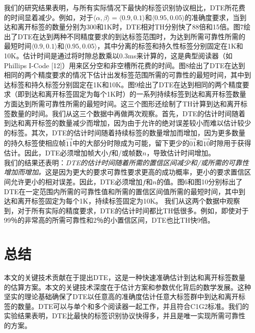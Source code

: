 \documentclass[UTF8]{ctexart}
\begin{document}
	我们的研究结果表明，与所有实际情况下最快的标签识别协议相比，DTE所花费的时间显着减少。例如，对于$\langle\alpha,\beta\rangle = \langle 0.9,0.1\rangle$和$\langle 0.95,0.05\rangle$的准确度要求，当到达和离开标签的数量分别为300和1K时，DTE相对TH分别快了88倍和15倍。图7绘出了DTE在达到两种不同精度要求的到达标签范围时，为达到所需可靠性所需的最短时间$\langle 0.9,0.1\rangle$和$\langle 0.95,0.05\rangle$，其中分离的标签和持久性标签分别固定在1K和10K。估计时间是通过将时隙总数乘以0.3ms来计算的，这是典型阅读器（如Phillips I-Code [12]）用来区分空和非空槽所花费的时间。图8绘出了DTE在达到相同的两个精度要求的情况下估计出发标签范围所需的可靠性的最短时间，其中到达标签和持久标签分别固定在1K和10K。图9绘出了DTE在达到相同的两个精度要求（即到达和离开标签固定为每个1K时）的一系列持续标签到达和离开标签数量方面达到所需可靠性所需的最短时间。这三个图形还绘制了TH计算到达和离开标签数量的时间。我们从这三个数据中再做两次观察。首先，DTE的估计时间随着到达和离开标签的数量减少而增加，因为由于允许的绝对误差较小而难以估计较少的标签。其次，DTE的估计时间随着持续标签的数量增加而增加，因为更多数量的持久标签使相应帧$\vec{11}$中的大部分时隙成为可能，留下更少的$\vec{01}$和$\vec{10}$时隙用于获得估计。因此，DTE必须增加帧大小$f$和/或帧数$n$，导致估计时间增加。 \\ 
	\indent 我们的结果还表明：\emph{DTE的估计时间随着所需的置信区间减少和/或所需的可靠性增加而增加。}这是因为更大的要求可靠性要求更高的成功概率，更小的要求置信区间允许更小的相对误差。因此，DTE必须增加$f$和$n$的值。图6和图10分别标出了DTE在一定范围内所需的可靠性值和所需的置信区间值所需的最短时间，其中到达和离开标签固定为每个1K，持续标签固定为10K。 我们从这两个数据中观察到，对于所有实际的精度要求，DTE的估计时间都比TH低很多。例如，即使对于99％的非常高的所需可靠性和2％的小置信区间，DTE也比TH快9倍。
	
	
	\section{总结}\label{sec:Conclusion}
	本文的关键技术贡献在于提出DTE，这是一种快速准确估计到达和离开标签数量的估算方案。本文的关键技术深度在于估计方案和参数优化背后的数学发展。这种坚实的理论基础确保了DTE以任意高的准确度估计任意大标签群中到达和离开标签的数量。DTE可以与单个和多个阅读器一起工作，并且符合C1G2标准。我们的实验结果表明，DTE比最快的标签识别协议快得多，并且是唯一实现所需可靠性的方案。
\end{document}
